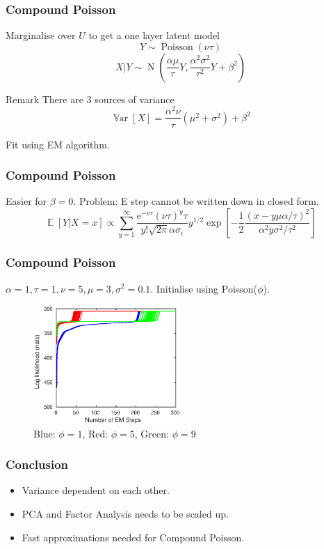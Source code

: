 \documentclass{beamer}
\DeclareMathOperator{\expectation}{\mathbb{E}}
\DeclareMathOperator{\variance}{\mathbb{V}ar}
\DeclareMathOperator{\normal}{N}
\DeclareMathOperator{\poisson}{Poisson}
\newcommand{\euler}{\mathrm{e}}
\begin{document}
\begin{frame}
\frametitle{Compound Poisson}
Marginalise over $U$ to get a one layer latent model
\pause
\begin{equation}
Y\sim\poisson(\nu\tau)
\end{equation}
\begin{equation}
X|Y\sim\normal\left(
\frac{\alpha\mu}{\tau}Y,\frac{\alpha^2\sigma^2}{\tau^2}Y+\beta^2
\right)
\end{equation}
\pause
\begin{block}{Remark}
There are 3 sources of variance
\begin{equation}
\variance[X] = \frac{\alpha^2\nu}{\tau}\left(\mu^2+\sigma^2\right)+\beta^2
\end{equation}
\end{block}
\pause
Fit using EM algorithm.
\end{frame}

\begin{frame}
\frametitle{Compound Poisson}
Easier for $\beta=0$. Problem: E step cannot be written down in closed form.
\begin{equation}
\expectation\left[Y|X=x\right]\propto
\sum_{y=1}^{\infty}\dfrac{\euler^{-\nu\tau}(\nu\tau)^{y}\tau}{y!\sqrt{2\pi}\alpha\sigma_i}y^{1/2}
\exp\left[-\dfrac{1}{2}\dfrac{\left(x-y\mu\alpha/\tau\right)^2}{\alpha^2y\sigma^2/\tau^2}\right]
\end{equation}
\end{frame}

\begin{frame}
\frametitle{Compound Poisson}
$\alpha=1,\tau=1,\nu=5,\mu=3,\sigma^2=0.1.$ Initialise using Poisson($\phi$).
\begin{figure}
	\includegraphics[width=0.5\textwidth]{figures/hierarchicalModel/EM_initial_lnL.eps}
	\caption{Blue: $\phi=1$, Red: $\phi=5$, Green: $\phi=9$}
\end{figure}
\end{frame}

\begin{frame}
\frametitle{Conclusion}
\begin{itemize}
	\item Variance dependent on each other.
	\item PCA and Factor Analysis needs to be scaled up.
	\item Fast approximations needed for Compound Poisson.
\end{itemize}
\end{frame}
\end{document}
